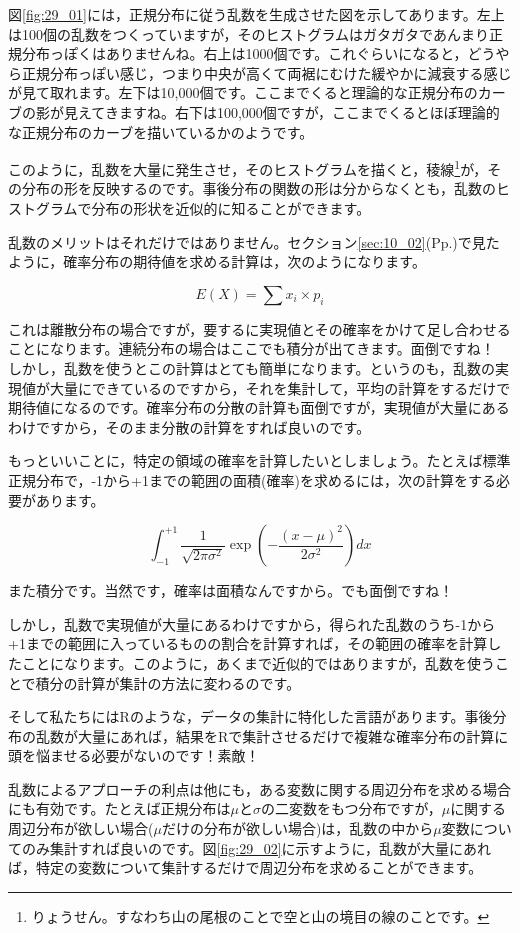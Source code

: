 \documentclass{ltjbook}
\begin{document}
図\ref{fig:29_01}には，正規分布に従う乱数を生成させた図を示してあります。左上は100個の乱数をつくっていますが，そのヒストグラムはガタガタであんまり正規分布っぽくはありませんね。右上は1000個です。これぐらいになると，どうやら正規分布っぽい感じ，つまり中央が高くて両裾にむけた緩やかに減衰する感じが見て取れます。左下は10,000個です。ここまでくると理論的な正規分布のカーブの影が見えてきますね。右下は100,000個ですが，ここまでくるとほぼ理論的な正規分布のカーブを描いているかのようです。

このように，乱数を大量に発生させ，そのヒストグラムを描くと，稜線\footnote{りょうせん。すなわち山の尾根のことで空と山の境目の線のことです。}が，その分布の形を反映するのです。事後分布の関数の形は分からなくとも，乱数のヒストグラムで分布の形状を近似的に知ることができます。

乱数のメリットはそれだけではありません。セクション\ref{sec:10_02}(Pp.\pageref{sec:10_02})で見たように，確率分布の期待値を求める計算は，次のようになります。

\[ E(X) = \sum x_i \times p_i \]

これは離散分布の場合ですが，要するに実現値とその確率をかけて足し合わせることになります。連続分布の場合はここでも積分が出てきます。面倒ですね！
しかし，乱数を使うとこの計算はとても簡単になります。というのも，乱数の実現値が大量にできているのですから，それを集計して，平均の計算をするだけで期待値になるのです。確率分布の分散の計算も面倒ですが，実現値が大量にあるわけですから，そのまま分散の計算をすれば良いのです。

もっといいことに，特定の領域の確率を計算したいとしましょう。たとえば標準正規分布で，-1から+1までの範囲の面積(確率)を求めるには，次の計算をする必要があります。

\[\int_{-1}^{+1} \frac{1}{\sqrt{2\pi \sigma^2}} \exp \left(-\frac{(x-\mu)^2}{2\sigma^2}\right) dx \]

また積分です。当然です，確率は面積なんですから。でも面倒ですね！

しかし，乱数で実現値が大量にあるわけですから，得られた乱数のうち-1から+1までの範囲に入っているものの割合を計算すれば，その範囲の確率を計算したことになります。このように，あくまで近似的ではありますが，乱数を使うことで積分の計算が集計の方法に変わるのです。

そして私たちにはRのような，データの集計に特化した言語があります。事後分布の乱数が大量にあれば，結果をRで集計させるだけで複雑な確率分布の計算に頭を悩ませる必要がないのです！素敵！

乱数によるアプローチの利点は他にも，ある変数に関する周辺分布を求める場合にも有効です。たとえば正規分布は$\mu$と$\sigma$の二変数をもつ分布ですが，$\mu$に関する周辺分布が欲しい場合($\mu$だけの分布が欲しい場合)は，乱数の中から$\mu$変数についてのみ集計すれば良いのです。図\ref{fig:29_02}に示すように，乱数が大量にあれば，特定の変数について集計するだけで周辺分布を求めることができます。
\end{document}
